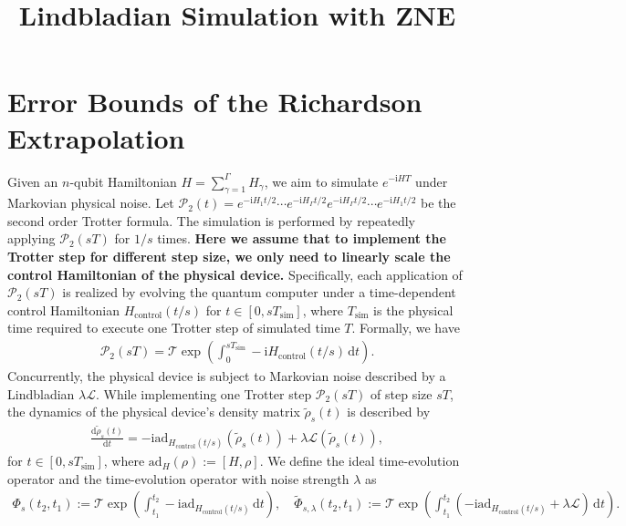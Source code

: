 \documentclass[11pt]{article}
\title{Lindbladian Simulation with ZNE}
\author{}
\date{}
\renewcommand{\i}{\mathrm{i}}
\renewcommand{\d}{\mathrm{d}}
\renewcommand{\L}{\mathcal{L}}
\newcommand{\ad}{\mathrm{ad}}
\newcommand{\T}{\mathcal{T}}
\renewcommand{\P}{\mathcal{P}}
\newcommand{\simu}{\mathrm{sim}}
\newcommand{\Hc}{H_{\mathrm{control}}}
\begin{document}
\maketitle
\section{Error Bounds of the Richardson Extrapolation}
Given an $n$-qubit Hamiltonian $H = \sum_{\gamma=1}^{\Gamma} H_{\gamma}$, we aim to simulate $e^{-\i H T}$ under Markovian physical noise. Let $\P_2(t)=e^{-\i H_1 t/2}\cdots e^{-\i H_{\Gamma} t/2} e^{-\i H_{\Gamma} t/2} \cdots e^{-\i H_1 t/2}$ be the second order Trotter formula. The simulation is performed by repeatedly applying $\P_2(sT)$ for $1/s$ times. \textbf{Here we assume that to implement the Trotter step for different step size, we only need to linearly scale the control Hamiltonian of the physical device.} Specifically, each application of $\P_2(sT)$ is realized by evolving the quantum computer under a time-dependent control Hamiltonian $\Hc(t/s)$ for $t\in [0, sT_{\simu}]$, where $T_{\simu}$ is the physical time required to execute one Trotter step of simulated time $T$. Formally, we have \begin{align*}
    \P_2(sT) = \T \exp(\int_{0}^{sT_{\simu}} - \i \Hc(t/s) \, \d t).
\end{align*}
Concurrently, the physical device is subject to Markovian noise described by a Lindbladian $\lambda \L$. While implementing one Trotter step $\P_2(sT)$ of step size $sT$, the dynamics of the physical device's density matrix $\tilde{\rho}_s(t)$ is described by \begin{align*}
    \frac{\d \tilde{\rho}_s(t)}{\d t} = -\i\ad_{\Hc(t/s)}(\tilde{\rho}_s(t))+\lambda \L(\tilde{\rho}_s(t)),
\end{align*}
for $t\in[0, sT_{\simu}]$, where $\ad_H(\rho) :=[H,\rho]$.
We define the ideal time-evolution operator and the time-evolution operator with noise strength $\lambda$ as \begin{align*}
    \Phi_s(t_2,t_1):=\T \exp(\int_{t_1}^{t_2} -\i\ad_{\Hc(t/s)}\,\d t),\quad \tilde{\Phi}_{s,\lambda}(t_2, t_1):=\T \exp(\int_{t_1}^{t_2}(-\i \ad_{\Hc(t/s)}+\lambda \L)\,\d t). 
\end{align*}
\end{document}

